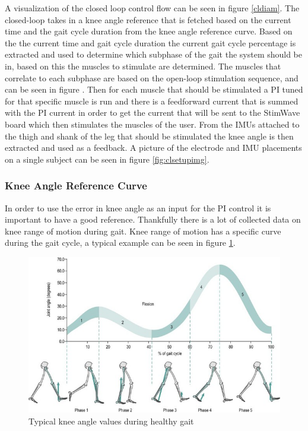A visualization of the closed loop control flow can be seen in figure \ref{cldiam}. The closed-loop takes in a knee angle reference that is fetched based on the current time and the gait cycle duration from the knee angle reference curve. Based on the the current time and gait cycle duration the current gait cycle percentage is extracted and used to determine which subphase of the gait the system should be in, based on this the muscles to stimulate are determined. The muscles that correlate to each subphase are based on the open-loop stimulation sequence, and can be seen in figure . Then for each muscle that should be stimulated a PI tuned for that specific muscle is run and there is a feedforward current that is summed with the PI current in order to get the current that will be sent to the StimWave board which then stimulates the muscles of the user. From the IMUs attached to the thigh and shank of the leg that should be stimulated the knee angle is then extracted and used as a feedback. A picture of the electrode and IMU placements on a single subject can be seen in figure \ref{fig:clsetupimg}.


\subsubsection{Knee Angle Reference Curve}
In order to use the error in knee angle as an input for the PI control it is important to have a good reference. Thankfully there is a lot of collected data on knee range of motion during gait. Knee range of motion has a specific curve during the gait cycle, a typical example can be seen in figure \ref{fig:kneecurvetypical}.
\begin{figure} [h]
    \centering
    \includegraphics[width=0.99\linewidth]{images/B9780702043444000158_f015-005-9780702043444.jpg}
    \caption{Typical knee angle values during healthy gait \cite{themes_biomechanics_2017}}
    \label{fig:kneecurvetypical}
\end{figure}
\newline 

